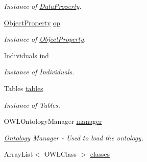\begin{DoxyCompactItemize}
\begin{DoxyCompactList}\small\item\em Instance of \hyperlink{class_ontology_1_1_data_property}{DataProperty}. \end{DoxyCompactList}\item 
\hypertarget{class_ontology_1_1_ontology_a27524c8041d723d37ac70249157a8047}{
\hyperlink{class_ontology_1_1_object_property}{ObjectProperty} \hyperlink{class_ontology_1_1_ontology_a27524c8041d723d37ac70249157a8047}{op}}
\label{class_ontology_1_1_ontology_a27524c8041d723d37ac70249157a8047}

\begin{DoxyCompactList}\small\item\em Instance of \hyperlink{class_ontology_1_1_object_property}{ObjectProperty}. \end{DoxyCompactList}\item 
\hypertarget{class_ontology_1_1_ontology_af8d92920b83a12fa85e86c9b8b606c2e}{
Individuals \hyperlink{class_ontology_1_1_ontology_af8d92920b83a12fa85e86c9b8b606c2e}{ind}}
\label{class_ontology_1_1_ontology_af8d92920b83a12fa85e86c9b8b606c2e}

\begin{DoxyCompactList}\small\item\em Instance of Individuals. \end{DoxyCompactList}\item 
\hypertarget{class_ontology_1_1_ontology_abf6ad8e362e7c57b8fad20f688765dac}{
Tables \hyperlink{class_ontology_1_1_ontology_abf6ad8e362e7c57b8fad20f688765dac}{tables}}
\label{class_ontology_1_1_ontology_abf6ad8e362e7c57b8fad20f688765dac}

\begin{DoxyCompactList}\small\item\em Instance of Tables. \end{DoxyCompactList}\item 
\hypertarget{class_ontology_1_1_ontology_a23f7c60be021e9813bc3b004166b12d1}{
OWLOntologyManager \hyperlink{class_ontology_1_1_ontology_a23f7c60be021e9813bc3b004166b12d1}{manager}}
\label{class_ontology_1_1_ontology_a23f7c60be021e9813bc3b004166b12d1}

\begin{DoxyCompactList}\small\item\em \hyperlink{class_ontology_1_1_ontology}{Ontology} Manager -\/ Used to load the ontology. \end{DoxyCompactList}\item 
\hypertarget{class_ontology_1_1_ontology_a60484a66d42244f83c944d7fd7f67fcf}{
ArrayList$<$ OWLClass $>$ \hyperlink{class_ontology_1_1_ontology_a60484a66d42244f83c944d7fd7f67fcf}{classes}}
\label{class_ontology_1_1_ontology_a60484a66d42244f83c944d7fd7f67fcf}


\end{DoxyCompactItemize}
